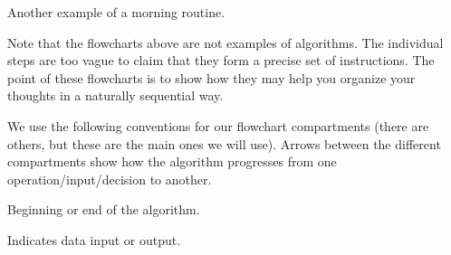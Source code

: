 \documentclass{ximera}
\begin{document}
\begin{center}
\end{center}
\begin{center}
	Another example of a morning routine.
\end{center}

Note that the flowcharts above are not examples of algorithms. The individual steps are too vague to claim that they form a precise set of instructions. The point of these flowcharts is to show how they may help you organize your thoughts in a naturally sequential way.

We use the following conventions for our flowchart compartments (there are others, but these are the main ones we will use). Arrows between the different compartments show how the algorithm progresses from one operation/input/decision to another.

\begin{center}
\end{center}
\begin{center}
	Beginning or end of the algorithm.
\end{center}

\begin{center}
\end{center}
\begin{center}
	Indicates data input or output.
\end{center}
\end{document}
